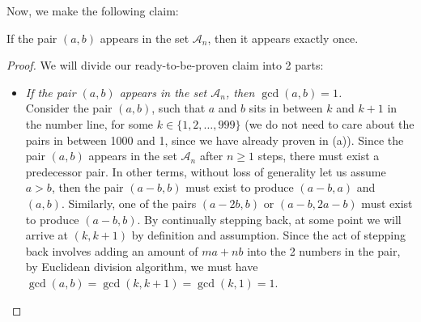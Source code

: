 \documentclass[11pt]{article}
\begin{document}
\begin{solution}
\begin{enumerate}
\begin{center}
                \end{center}

                Now, we make the following claim:

                \begin{claim}
                    If the pair \((a,b)\) appears in the set \(\mathcal{A}_n\), then it appears exactly once.
                \end{claim}

                \begin{proof}
                    We will divide our ready-to-be-proven claim into 2 parts:
                    
                    \begin{itemize}
                        \item \textit{If the pair \((a,b)\) appears in the set \(\mathcal{A}_n\), then \(\gcd(a,b) = 1\).}\\
                        Consider the pair \((a,b)\), such that \(a\) and \(b\) sits in between \(k\) and \(k + 1\) in the number line, for some \(k \in \{1,2,\dots,999\}\) (we do not need to care about the pairs in between 1000 and 1, since we have already proven in (a)). Since the pair \((a,b)\) appears in the set \(\mathcal{A}_n\) after \(n \geq 1\) steps, there must exist a predecessor pair. In other terms, without loss of generality let us assume \(a > b\), then the pair \((a - b,b)\) must exist to produce \((a - b,a)\) and \((a,b)\). Similarly, one of the pairs \((a - 2b,b)\) or \((a - b, 2a - b)\) must exist to produce \((a - b,b)\). By continually stepping back, at some point we will arrive at \((k,k + 1)\) by definition and assumption. Since the act of stepping back involves adding an amount of \(ma + nb\) into the 2 numbers in the pair, by Euclidean division algorithm, we must have \(\gcd(a,b) = \gcd(k,k+1) = \gcd(k,1) = 1\).
                        

\end{itemize}
\end{proof}
\end{enumerate}
\end{solution}
\end{document}
